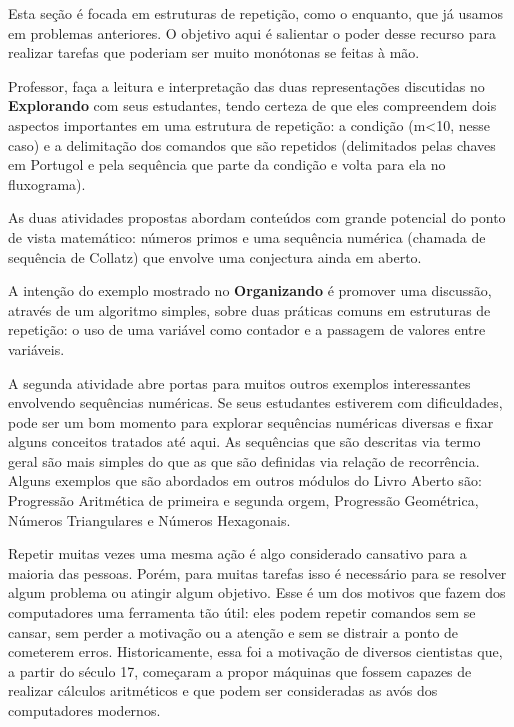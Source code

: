 \def\currentcolor{session1}
\begin{texto}
{
Esta seção é focada em estruturas de repetição, como o enquanto, que já usamos em problemas anteriores. O objetivo aqui é salientar o poder desse recurso para realizar tarefas que poderiam ser muito monótonas se feitas à mão.

Professor, faça a leitura e interpretação das duas representações discutidas no \textbf{Explorando} com seus estudantes, tendo certeza de que eles compreendem dois aspectos importantes em uma estrutura de repetição: a condição (m<10, nesse caso) e a delimitação dos comandos que são repetidos (delimitados pelas chaves em Portugol e pela sequência que parte da condição e volta para ela no fluxograma).

As duas atividades propostas abordam conteúdos com grande potencial do ponto de vista matemático: números primos e uma sequência numérica (chamada de sequência de Collatz) que envolve uma conjectura ainda em aberto.

A intenção do exemplo mostrado no \textbf{Organizando} é promover uma discussão, através de um algoritmo simples, sobre duas práticas comuns em estruturas de repetição: o uso de uma variável como contador e a passagem de valores entre variáveis.

A segunda atividade abre portas para muitos outros exemplos interessantes envolvendo sequências numéricas. Se seus estudantes estiverem com dificuldades, pode ser um bom momento para explorar sequências numéricas diversas e fixar alguns conceitos tratados até aqui. As sequências que são descritas via termo geral são mais simples do que as que são definidas via relação de recorrência. Alguns exemplos que são abordados em outros módulos do Livro Aberto são: Progressão Aritmética de primeira e segunda orgem, Progressão Geométrica, Números Triangulares e Números Hexagonais.
}
\end{texto}

\label{comp-exp5}

Repetir muitas vezes uma mesma ação é algo considerado cansativo para a maioria das pessoas. Porém, para muitas tarefas isso é necessário para se resolver algum problema ou atingir algum objetivo. Esse é um dos motivos que fazem dos computadores uma ferramenta tão útil: eles podem repetir comandos sem se cansar, sem perder a motivação ou a atenção e sem se distrair a ponto de cometerem erros. Historicamente, essa foi a motivação de diversos cientistas que, a partir do século 17, começaram a propor máquinas que fossem capazes de realizar cálculos aritméticos e que podem ser consideradas as avós dos computadores modernos.

